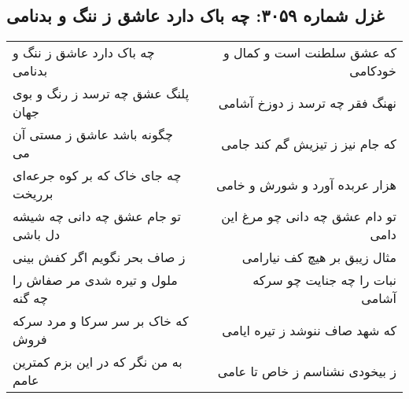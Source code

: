 \begin{center}
\section*{غزل شماره ۳۰۵۹: چه باک دارد عاشق ز ننگ و بدنامی}
\label{sec:3059}
\begin{longtable}{l p{0.5cm} r}
چه باک دارد عاشق ز ننگ و بدنامی
&&
که عشق سلطنت است و کمال و خودکامی
\\
پلنگ عشق چه ترسد ز رنگ و بوی جهان
&&
نهنگ فقر چه ترسد ز دوزخ آشامی
\\
چگونه باشد عاشق ز مستی آن می
&&
که جام نیز ز تیزیش گم کند جامی
\\
چه جای خاک که بر کوه جرعه‌ای برریخت
&&
هزار عربده آورد و شورش و خامی
\\
تو جام عشق چه دانی چه شیشه دل باشی
&&
تو دام عشق چه دانی چو مرغ این دامی
\\
ز صاف بحر نگویم اگر کفش بینی
&&
مثال زیبق بر هیچ کف نیارامی
\\
ملول و تیره شدی مر صفاش را چه گنه
&&
نبات را چه جنایت چو سرکه آشامی
\\
که خاک بر سر سرکا و مرد سرکه فروش
&&
که شهد صاف ننوشد ز تیره ایامی
\\
به من نگر که در این بزم کمترین عامم
&&
ز بیخودی نشناسم ز خاص تا عامی
\\
\end{longtable}
\end{center}
